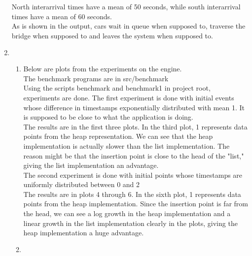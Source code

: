 \documentclass{article}
\begin{document}
\begin{enumerate}
		\\ \hfill \\
		North interarrival times have a mean of 50 seconds, while south interarrival times have a mean of 60 seconds.\\
		As is shown in the output, cars wait in queue when supposed to, traverse the bridge when supposed to and leaves the system when supposed to.
		\item 
		\begin{enumerate}
			\item 
			Below are plots from the experiments on the engine.\\
			The benchmark programs are in src/benchmark\\
			Using the scripts benchmark and benchmark1 in project root, experiments are done.
			The first experiment is done with initial events whose difference in timestamps exponentially distributed with mean 1. It is supposed to be close to what the application is doing.\\
			The results are in the first three plots. In the third plot, 1 represents data points from the heap representation. We can see that the heap implementation is actually slower than the list implementation. The reason might be that the insertion point is close to the head of the "list," giving the list implementation an advantage.\\
			The second experiment is done with initial points whose timestamps are uniformly distributed between 0 and 2\\
			The results are in plots 4 through 6. In the sixth plot, 1 represents data points from the heap implementation.
			Since the insertion point is far from the head, we can see a log growth in the heap implementation and a linear growth in the list implementation clearly in the plots, giving the heap implementation a huge advantage.\\
			
			\item 
			
		\end{enumerate}
		
	\end{enumerate}
	
	
	
\end{document}
